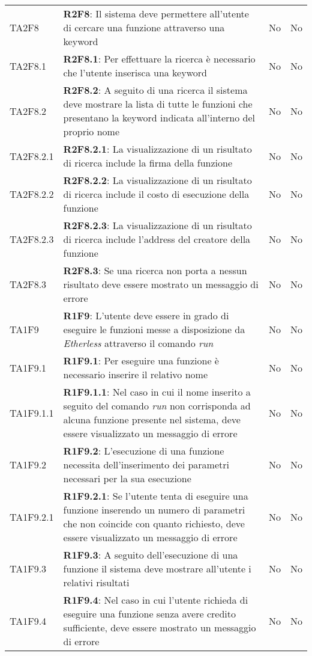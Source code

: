 \begin{longtable}{ 
		>{\centering}p{} 
		>{}p{} 
		>{\centering}p{}
		>{\centering}p{} }
	TA2F8 & \textbf{R2F8}: Il sistema deve permettere all'utente di cercare una funzione 
		attraverso una keyword 														& No & No \tabularnewline
	TA2F8.1 & \textbf{R2F8.1}: Per effettuare la ricerca è necessario che l'utente inserisca 
		una keyword 																& No & No \tabularnewline
	TA2F8.2 & \textbf{R2F8.2}: A seguito di una ricerca il sistema deve mostrare la lista di
	 tutte le funzioni che presentano la keyword indicata 
	 all'interno del proprio nome													& No & No \tabularnewline
	TA2F8.2.1 & \textbf{R2F8.2.1}: La visualizzazione di un risultato di ricerca include
		 la firma della funzione													& No & No \tabularnewline
  	TA2F8.2.2 & \textbf{R2F8.2.2}: La visualizzazione di un risultato di ricerca include
		  il costo di esecuzione della funzione										& No & No \tabularnewline
  	TA2F8.2.3 & \textbf{R2F8.2.3}: La visualizzazione di un risultato di ricerca include
		  l'address del creatore della funzione									& No & No \tabularnewline
	TA2F8.3 & \textbf{R2F8.3}: Se una ricerca non porta a nessun risultato deve essere mostrato un 
		messaggio di errore 														& No & No \tabularnewline	
	
	TA1F9 & \textbf{R1F9}: L'utente deve essere in grado di eseguire le funzioni messe a 
		disposizione da \textit{Etherless} attraverso il comando \textit{run} 				& No & No \tabularnewline
	TA1F9.1 & \textbf{R1F9.1}: Per eseguire una funzione è necessario inserire il relativo nome 		& No & No \tabularnewline
	TA1F9.1.1 & \textbf{R1F9.1.1}: Nel caso in cui il nome inserito a seguito del comando \textit{run} non 
		corrisponda ad alcuna funzione presente nel sistema, deve essere 
		visualizzato un messaggio di errore											& No & No \tabularnewline 
	TA1F9.2 & \textbf{R1F9.2}: L'esecuzione di una funzione necessita dell'inserimento dei parametri necessari per la sua esecuzione 															& No & No \tabularnewline
	TA1F9.2.1 & \textbf{R1F9.2.1}: Se l'utente tenta di eseguire una funzione inserendo un numero 
		di parametri che non coincide con quanto richiesto, deve essere 
		visualizzato un messaggio di errore 										& No & No \tabularnewline
	TA1F9.3 & \textbf{R1F9.3}: A seguito dell'esecuzione di una funzione il sistema deve mostrare 
		all'utente i relativi risultati 											& No & No \tabularnewline
	TA1F9.4 & \textbf{R1F9.4}: Nel caso in cui l'utente richieda di eseguire una funzione senza 
		avere credito sufficiente, deve essere mostrato un messaggio di errore		& No & No \tabularnewline
	

\end{longtable}
